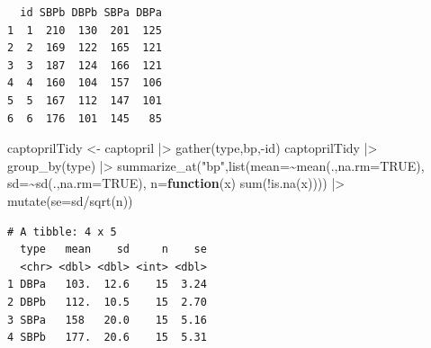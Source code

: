 \documentclass[
  dutch,
  letterpaper,
  12pt]{book}
\newenvironment{Shaded}{\begin{snugshade}}{\end{snugshade}}
\newcommand{\AttributeTok}[1]{\textcolor[rgb]{0.40,0.45,0.13}{#1}}
\newcommand{\ConstantTok}[1]{\textcolor[rgb]{0.56,0.35,0.01}{#1}}
\newcommand{\ControlFlowTok}[1]{\textcolor[rgb]{0.00,0.23,0.31}{\textbf{#1}}}
\newcommand{\FunctionTok}[1]{\textcolor[rgb]{0.28,0.35,0.67}{#1}}
\newcommand{\NormalTok}[1]{\textcolor[rgb]{0.00,0.23,0.31}{#1}}
\newcommand{\OtherTok}[1]{\textcolor[rgb]{0.00,0.23,0.31}{#1}}
\newcommand{\SpecialCharTok}[1]{\textcolor[rgb]{0.37,0.37,0.37}{#1}}
\newcommand{\StringTok}[1]{\textcolor[rgb]{0.13,0.47,0.30}{#1}}
\theoremstyle{definition}
\theoremstyle{definition}
\theoremstyle{definition}
\theoremstyle{remark}
\begin{document}
\begin{verbatim}
  id SBPb DBPb SBPa DBPa
1  1  210  130  201  125
2  2  169  122  165  121
3  3  187  124  166  121
4  4  160  104  157  106
5  5  167  112  147  101
6  6  176  101  145   85
\end{verbatim}

\begin{Shaded}
\begin{Highlighting}[]
\NormalTok{captoprilTidy }\OtherTok{\textless{}{-}}\NormalTok{ captopril }\SpecialCharTok{|\textgreater{}} \FunctionTok{gather}\NormalTok{(type,bp,}\SpecialCharTok{{-}}\NormalTok{id)}
\NormalTok{captoprilTidy }\SpecialCharTok{|\textgreater{}}
  \FunctionTok{group\_by}\NormalTok{(type) }\SpecialCharTok{|\textgreater{}}
  \FunctionTok{summarize\_at}\NormalTok{(}\StringTok{"bp"}\NormalTok{,}\FunctionTok{list}\NormalTok{(}\AttributeTok{mean=}\SpecialCharTok{\textasciitilde{}}\FunctionTok{mean}\NormalTok{(.,}\AttributeTok{na.rm=}\ConstantTok{TRUE}\NormalTok{),}
                    \AttributeTok{sd=}\SpecialCharTok{\textasciitilde{}}\FunctionTok{sd}\NormalTok{(.,}\AttributeTok{na.rm=}\ConstantTok{TRUE}\NormalTok{),}
                    \AttributeTok{n=}\ControlFlowTok{function}\NormalTok{(x) }\FunctionTok{sum}\NormalTok{(}\SpecialCharTok{!}\FunctionTok{is.na}\NormalTok{(x)))) }\SpecialCharTok{|\textgreater{}}
  \FunctionTok{mutate}\NormalTok{(}\AttributeTok{se=}\NormalTok{sd}\SpecialCharTok{/}\FunctionTok{sqrt}\NormalTok{(n))}
\end{Highlighting}
\end{Shaded}

\begin{verbatim}
# A tibble: 4 x 5
  type   mean    sd     n    se
  <chr> <dbl> <dbl> <int> <dbl>
1 DBPa   103.  12.6    15  3.24
2 DBPb   112.  10.5    15  2.70
3 SBPa   158   20.0    15  5.16
4 SBPb   177.  20.6    15  5.31
\end{verbatim}
\end{document}
